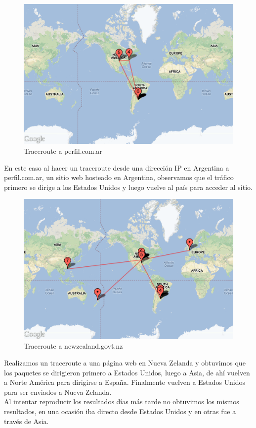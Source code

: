 \begin{figure}[H]
\begin{center}
\includegraphics[width=17cm]{perfil.png}
\end{center}
\caption{Traceroute a perfil.com.ar} \label{figura1}
\end{figure}

En este caso al hacer un traceroute desde una dirección IP en Argentina a perfil.com.ar, un sitio web hosteado en Argentina, observamos que el tráfico primero se dirige a los Estados Unidos y luego vuelve al país para acceder al sitio.

\begin{figure}[H]
\begin{center}
\includegraphics[width=17cm]{newzealand.png}
\end{center}
\caption{Traceroute a newzealand.govt.nz} \label{figura1}
\end{figure}

Realizamos un traceroute a una página web en Nueva Zelanda y obtuvimos que los paquetes se dirigieron primero a Estados Unidos, luego a Asia, de ahí vuelven a Norte América para dirigirse a España. Finalmente vuelven a Estados Unidos para ser enviados a Nueva Zelanda.	\\
\indent	Al intentar reproducir los resultados días más tarde no obtuvimos los mismos resultados, en una ocasión iba directo desde Estados Unidos y en otras fue a través de Asia.
